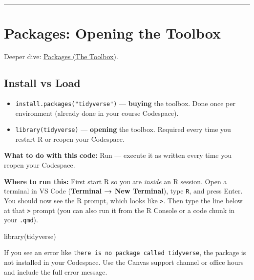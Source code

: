 \documentclass[
  letterpaper,
  DIV=11,
  numbers=noendperiod,
  oneside]{scrreprt}
\newenvironment{Shaded}{\begin{snugshade}}{\end{snugshade}}
\newcommand{\FunctionTok}[1]{\textcolor[rgb]{0.28,0.35,0.67}{#1}}
\newcommand{\NormalTok}[1]{\textcolor[rgb]{0.00,0.23,0.31}{#1}}
\providecommand{\tightlist}{%
  \setlength{\itemsep}{0pt}\setlength{\parskip}{0pt}}
\begin{document}
\begin{center}\rule{0.5\linewidth}{0.5pt}\end{center}

\section*{Packages: Opening the
Toolbox}\label{packages-opening-the-toolbox}


Deeper dive: \href{r02-packages.qmd}{Packages (The Toolbox)}.

\subsection*{Install vs Load}\label{install-vs-load}

\begin{itemize}
\tightlist
\item
  \texttt{install.packages("tidyverse")} --- \textbf{buying} the
  toolbox. Done once per environment (already done in your course
  Codespace).
\item
  \texttt{library(tidyverse)} --- \textbf{opening} the toolbox. Required
  every time you restart R or reopen your Codespace.
\end{itemize}

\textbf{What to do with this code:} Run --- execute it as written every
time you reopen your Codespace.

\textbf{Where to run this:} First start R so you are \emph{inside} an R
session. Open a terminal in VS Code (\textbf{Terminal → New Terminal}),
type \texttt{R}, and press Enter. You should now see the R prompt, which
looks like \texttt{\textgreater{}}. Then type the line below at that
\texttt{\textgreater{}} prompt (you can also run it from the R Console
or a code chunk in your \texttt{.qmd}).

\begin{Shaded}
\begin{Highlighting}[numbers=left,,]
\FunctionTok{library}\NormalTok{(tidyverse)}
\end{Highlighting}
\end{Shaded}

\begin{tcolorbox}[enhanced jigsaw, title=\textcolor{quarto-callout-note-color}{\faInfo}\hspace{0.5em}{Note}, arc=.35mm, toptitle=1mm, colframe=quarto-callout-note-color-frame, toprule=.15mm, leftrule=.75mm, bottomtitle=1mm, opacityback=0, bottomrule=.15mm, coltitle=black, breakable, opacitybacktitle=0.6, titlerule=0mm, colback=white, left=2mm, colbacktitle=quarto-callout-note-color!10!white, rightrule=.15mm]

If you see an error like
\texttt{there\ is\ no\ package\ called\ \textquotesingle{}tidyverse\textquotesingle{}},
the package is not installed in your Codespace. Use the Canvas support
channel or office hours and include the full error message.

\end{tcolorbox}
\end{document}
